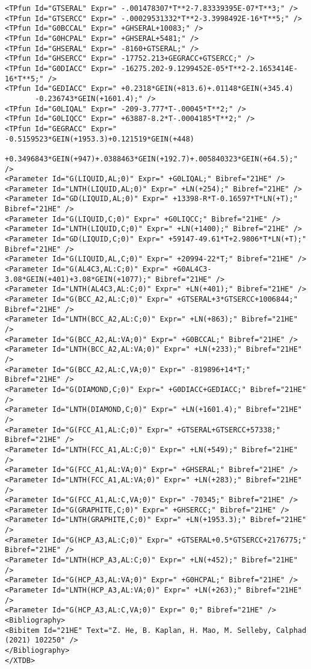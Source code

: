 \documentclass[preprint,review,12pt]{elsarticle}
\begin{document}
\begin{appendix}
{\begin{verbatim}
<TPfun Id="GTSERAL" Expr=" -.001478307*T**2-7.83339395E-07*T**3;" /> 
<TPfun Id="GTSERCC" Expr=" -.00029531332*T**2-3.3998492E-16*T**5;" /> 
<TPfun Id="G0BCCAL" Expr=" +GHSERAL+10083;" /> 
<TPfun Id="G0HCPAL" Expr=" +GHSERAL+5481;" /> 
<TPfun Id="GHSERAL" Expr=" -8160+GTSERAL;" /> 
<TPfun Id="GHSERCC" Expr=" -17752.213+GEGRACC+GTSERCC;" /> 
<TPfun Id="G0DIACC" Expr=" -16275.202-9.1299452E-05*T**2-2.1653414E-16*T**5;" /> 
<TPfun Id="GEDIACC" Expr=" +0.2318*GEIN(+813.6)+.01148*GEIN(+345.4)
       -0.236743*GEIN(+1601.4);" /> 
<TPfun Id="G0LIQAL" Expr=" -209-3.777*T-.00045*T**2;" /> 
<TPfun Id="G0LIQCC" Expr=" +63887-8.2*T-.0004185*T**2;" /> 
<TPfun Id="GEGRACC" Expr=" -0.5159523*GEIN(+1953.3)+0.121519*GEIN(+448)
       +0.3496843*GEIN(+947)+.0388463*GEIN(+192.7)+.005840323*GEIN(+64.5);" /> 
<Parameter Id="G(LIQUID,AL;0)" Expr=" +G0LIQAL;" Bibref="21HE" />
<Parameter Id="LNTH(LIQUID,AL;0)" Expr=" +LN(+254);" Bibref="21HE" />
<Parameter Id="GD(LIQUID,AL;0)" Expr=" +13398-R*T-0.16597*T*LN(+T);" Bibref="21HE" />
<Parameter Id="G(LIQUID,C;0)" Expr=" +G0LIQCC;" Bibref="21HE" />
<Parameter Id="LNTH(LIQUID,C;0)" Expr=" +LN(+1400);" Bibref="21HE" />
<Parameter Id="GD(LIQUID,C;0)" Expr=" +59147-49.61*T+2.9806*T*LN(+T);" Bibref="21HE" />
<Parameter Id="G(LIQUID,AL,C;0)" Expr=" +20994-22*T;" Bibref="21HE" />
<Parameter Id="G(AL4C3,AL:C;0)" Expr=" +G0AL4C3-3.08*GEIN(+401)+3.08*GEIN(+1077);" Bibref="21HE" />
<Parameter Id="LNTH(AL4C3,AL:C;0)" Expr=" +LN(+401);" Bibref="21HE" />
<Parameter Id="G(BCC_A2,AL:C;0)" Expr=" +GTSERAL+3*GTSERCC+1006844;" Bibref="21HE" />
<Parameter Id="LNTH(BCC_A2,AL:C;0)" Expr=" +LN(+863);" Bibref="21HE" />
<Parameter Id="G(BCC_A2,AL:VA;0)" Expr=" +G0BCCAL;" Bibref="21HE" />
<Parameter Id="LNTH(BCC_A2,AL:VA;0)" Expr=" +LN(+233);" Bibref="21HE" />
<Parameter Id="G(BCC_A2,AL:C,VA;0)" Expr=" -819896+14*T;" Bibref="21HE" />
<Parameter Id="G(DIAMOND,C;0)" Expr=" +G0DIACC+GEDIACC;" Bibref="21HE" />
<Parameter Id="LNTH(DIAMOND,C;0)" Expr=" +LN(+1601.4);" Bibref="21HE" />
<Parameter Id="G(FCC_A1,AL:C;0)" Expr=" +GTSERAL+GTSERCC+57338;" Bibref="21HE" />
<Parameter Id="LNTH(FCC_A1,AL:C;0)" Expr=" +LN(+549);" Bibref="21HE" />
<Parameter Id="G(FCC_A1,AL:VA;0)" Expr=" +GHSERAL;" Bibref="21HE" />
<Parameter Id="LNTH(FCC_A1,AL:VA;0)" Expr=" +LN(+283);" Bibref="21HE" />
<Parameter Id="G(FCC_A1,AL:C,VA;0)" Expr=" -70345;" Bibref="21HE" />
<Parameter Id="G(GRAPHITE,C;0)" Expr=" +GHSERCC;" Bibref="21HE" />
<Parameter Id="LNTH(GRAPHITE,C;0)" Expr=" +LN(+1953.3);" Bibref="21HE" />
<Parameter Id="G(HCP_A3,AL:C;0)" Expr=" +GTSERAL+0.5*GTSERCC+2176775;" Bibref="21HE" />
<Parameter Id="LNTH(HCP_A3,AL:C;0)" Expr=" +LN(+452);" Bibref="21HE" />
<Parameter Id="G(HCP_A3,AL:VA;0)" Expr=" +G0HCPAL;" Bibref="21HE" />
<Parameter Id="LNTH(HCP_A3,AL:VA;0)" Expr=" +LN(+263);" Bibref="21HE" />
<Parameter Id="G(HCP_A3,AL:C,VA;0)" Expr=" 0;" Bibref="21HE" />
<Bibliography>
<Bibitem Id="21HE" Text="Z. He, B. Kaplan, H. Mao, M. Selleby, Calphad (2021) 102250" /> 
</Bibliography>
</XTDB>
\end{verbatim}
}


\end{appendix}
\end{document}
